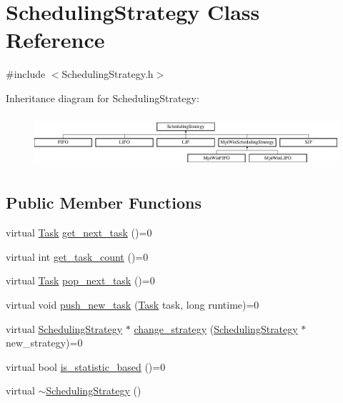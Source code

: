 \hypertarget{class_scheduling_strategy}{}\section{Scheduling\+Strategy Class Reference}
\label{class_scheduling_strategy}


{\ttfamily \#include $<$Scheduling\+Strategy.\+h$>$}

Inheritance diagram for Scheduling\+Strategy\+:\begin{figure}[H]
\begin{center}
\leavevmode
\includegraphics[height=1.953488cm]{class_scheduling_strategy}
\end{center}
\end{figure}
\subsection*{Public Member Functions}
\begin{DoxyCompactItemize}
\item 
virtual \hyperlink{_types_8h_a0c77930ab3818a1680c59353f627fba8}{Task} \hyperlink{class_scheduling_strategy_adce3619801460ad67d6c8f9bdffcd36b}{get\+\_\+next\+\_\+task} ()=0
\item 
virtual int \hyperlink{class_scheduling_strategy_a0a3355ffe9c03236692ad00e4f94f5c5}{get\+\_\+task\+\_\+count} ()=0
\item 
virtual \hyperlink{_types_8h_a0c77930ab3818a1680c59353f627fba8}{Task} \hyperlink{class_scheduling_strategy_ac2ba483287c91fd4318f337da144a9c5}{pop\+\_\+next\+\_\+task} ()=0
\item 
virtual void \hyperlink{class_scheduling_strategy_a62ffa0426528c14fdd0b0853f04a851f}{push\+\_\+new\+\_\+task} (\hyperlink{_types_8h_a0c77930ab3818a1680c59353f627fba8}{Task} task, long runtime)=0
\item 
virtual \hyperlink{class_scheduling_strategy}{Scheduling\+Strategy} $\ast$ \hyperlink{class_scheduling_strategy_a4874d194c1bb185480339360fe907d83}{change\+\_\+strategy} (\hyperlink{class_scheduling_strategy}{Scheduling\+Strategy} $\ast$new\+\_\+strategy)=0
\item 
virtual bool \hyperlink{class_scheduling_strategy_a5962845ca5af53bbdc014c19a6bdef99}{is\+\_\+statistic\+\_\+based} ()=0
\item 
virtual \hyperlink{class_scheduling_strategy_a896eb08aa462cd1ecaa59ca02c7c0c58}{$\sim$\+Scheduling\+Strategy} ()
\end{DoxyCompactItemize}
